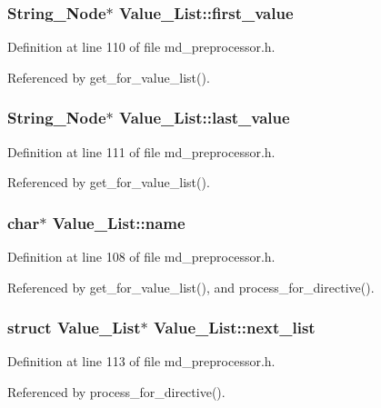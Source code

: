 \subsubsection{\setlength{\rightskip}{0pt plus 5cm}\bf{String\_\-Node}$\ast$ \bf{Value\_\-List::first\_\-value}}\label{structValue__List_16647cbcdf0842a60dbc418933b02f39}




Definition at line 110 of file md\_\-preprocessor.h.

Referenced by get\_\-for\_\-value\_\-list().
\subsubsection{\setlength{\rightskip}{0pt plus 5cm}\bf{String\_\-Node}$\ast$ \bf{Value\_\-List::last\_\-value}}\label{structValue__List_23265b17423c6aa570aa99ae8998b0b7}




Definition at line 111 of file md\_\-preprocessor.h.

Referenced by get\_\-for\_\-value\_\-list().
\subsubsection{\setlength{\rightskip}{0pt plus 5cm}char$\ast$ \bf{Value\_\-List::name}}\label{structValue__List_d6bca787563ebce2afdce6150a9ac8c5}




Definition at line 108 of file md\_\-preprocessor.h.

Referenced by get\_\-for\_\-value\_\-list(), and process\_\-for\_\-directive().
\subsubsection{\setlength{\rightskip}{0pt plus 5cm}struct \bf{Value\_\-List}$\ast$ \bf{Value\_\-List::next\_\-list}}\label{structValue__List_efb807cb098572e1b4664b5902519723}




Definition at line 113 of file md\_\-preprocessor.h.

Referenced by process\_\-for\_\-directive().
